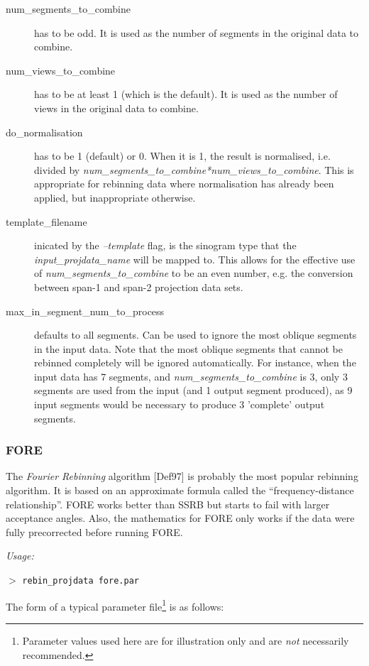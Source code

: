 \documentclass{article}
\newcommand{\cmdline}[1]{\par \noindent $>$ \texttt{#1}\par}
\begin{document}
\begin{description}
\item[num\_segments\_to\_combine] has to be odd. It is used as the 
number of segments in the original data to combine.
\item[num\_views\_to\_combine] has to be at least 1 (which 
is the default). It is used as the number of views in the original 
data to combine.
\item[do\_normalisation] has to be 1 (default) or 0. When it is 1, 
the result is normalised, i.e. divided by \textit{num\_segments\_to\_combine*num\_views\_to\_combine}. 
This is appropriate for rebinning data where normalisation has 
already been applied, but inappropriate otherwise.

\item[template\_filename] inicated by the \textit{--template} flag, 
is the sinogram type that the \textit{input\_projdata\_name} will 
be mapped to. This allows for the effective use of 
\textit{num\_segments\_to\_combine} to be an even number, 
e.g. the conversion between span-1 and span-2 projection data sets. 

\item[max\_in\_segment\_num\_to\_process] defaults to all segments. 
Can be used to ignore the most oblique segments in the input 
data. Note that the most oblique segments that cannot be rebinned 
completely will be ignored automatically. For instance, when 
the input data has 7 segments, and \textit{num\_segments\_to\_combine} is 
3, only 3 segments are used from the input (and 1 output segment 
produced), as 9 input segments would be necessary to produce 
3 'complete' output segments.
\end{description}

\subsubsection{
FORE}
\label{sec:FORE}
The \textit{Fourier Rebinning} algorithm [Def97] is probably the most popular
rebinning algorithm. It is based on an approximate formula called the
``frequency-distance relationship''. FORE works better than SSRB but starts
to fail with larger acceptance angles. Also, the mathematics
for FORE only works if the data were fully precorrected before running FORE.

\textit{Usage:}

\cmdline{rebin\_projdata fore.par}

The form of a typical parameter file\footnote{Parameter values used here are for
illustration only and are \textit{not} necessarily recommended.} is as follows:
\end{document}
